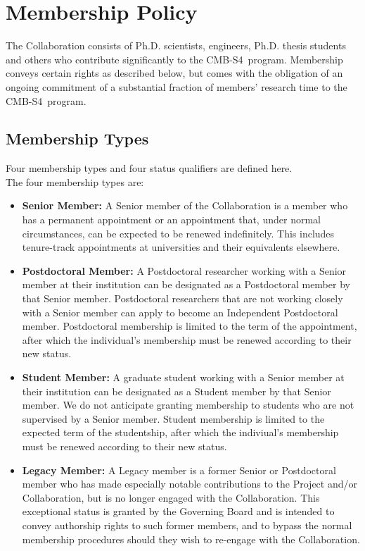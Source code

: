 \documentclass[12pt]{article}
\newcommand\collabname{CMB-S4}
\begin{document}
\section{Membership Policy}

The Collaboration consists of Ph.D. scientists, engineers, Ph.D. thesis students and others who contribute significantly to the \collabname\ program. Membership conveys certain rights as described below, but comes with the obligation of an ongoing commitment of a substantial fraction of members' research time to the \collabname\ program.

\subsection{Membership Types}
\label{sec:memtypes}

Four membership types and four status qualifiers are defined here. \\

\noindent The four membership types are:
\begin{itemize}

\item {\bf Senior Member:}
A Senior member of the Collaboration is a member who has a permanent appointment or an appointment that, under normal circumstances, can be expected to be renewed indefinitely.  This includes tenure-track appointments at universities and their equivalents elsewhere.

\item {\bf Postdoctoral Member:}
A Postdoctoral researcher working with a Senior member at their institution can be designated as a Postdoctoral member by that Senior member. Postdoctoral researchers that are not working closely with a Senior member can apply to become an Independent Postdoctoral member. Postdoctoral membership is limited to the term of the appointment, after which the individual's membership must be renewed according to their new status.

\item {\bf Student Member:}
A graduate student working with a Senior member at their institution can be designated as a Student member by that Senior member.  We do not anticipate granting membership to students who are not supervised by a Senior member. Student membership is limited to the expected term of the studentship, after which the indiviual's membership must be renewed according to their new status.

\item {\bf Legacy Member:}
A Legacy member is a former Senior or Postdoctoral member who has made especially notable contributions to the Project and/or Collaboration, but is no longer engaged with the Collaboration. This exceptional status is granted by the Governing Board and is intended to convey authorship rights to such former members, and to bypass the normal membership procedures should they wish to re-engage with the Collaboration.

\end{itemize}
\end{document}
